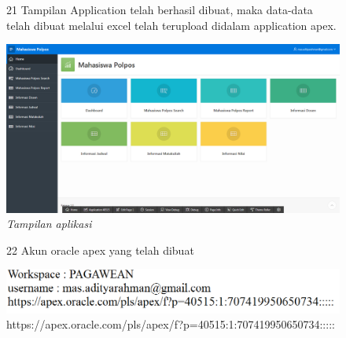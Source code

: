 \begin{enumerate}
\begin{figure}[!htbp]
\item[21]Tampilan Application telah berhasil dibuat, maka data-data telah dibuat melalui excel telah terupload didalam application apex.
	\begin{center}
	\includegraphics[scale=0.2]{figures/tahap23.png}
	\caption{\textit{Tampilan aplikasi}}
	\end{center}	 
\end{figure}

\begin{figure}[!htbp]
\item[22]Akun oracle apex yang telah dibuat \\
	\begin{center}
	\includegraphics[scale=0.2]{figures/tahap24.png} \\
	https://apex.oracle.com/pls/apex/f?p=40515:1:707419950650734:::::
	\end{center}	 
\end{figure}
\end{enumerate}